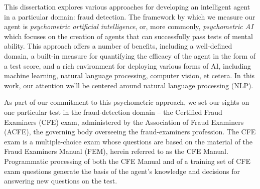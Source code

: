  
 
This dissertation explores various approaches for developing an intelligent agent in a particular domain: fraud detection.  The framework by which we measure our agent is \textit{psychometric artificial intelligence}, or, more commonly, \textit{psychometric AI} which focuses on the creation of agents that can successfully pass tests of mental ability.  This approach offers a number of benefits, including a well-defined domain, a built-in measure for quantifying the efficacy of the agent in the form of a test score, and a rich environment for deploying various forms of AI, including machine learning, natural language processing, computer vision, et cetera.  In this work, our attention we'll be centered around natural language processing (NLP).

As part of our commitment to this psychometric approach, we set our sights on one particular test in the fraud-detection domain -- the Certified Fraud Examiners (CFE) exam, administered by the Association of Fraud Examiners (ACFE), the governing body overseeing the fraud-examiners profession.  The CFE exam is a multiple-choice exam whose questions are based on the material of the Fraud Examiners Manual (FEM), herein referred to as the CFE Manual.  Programmatic processing of both the CFE Manual and of a training set of CFE exam questions generate the basis of the agent's knowledge and decisions for answering new questions on the test.

